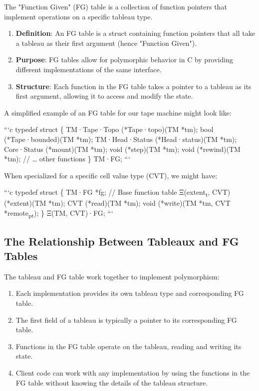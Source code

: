 \documentclass[11pt]{article}
\begin{document}
The "Function Given" (FG) table is a collection of function pointers that implement operations on a specific tableau type.

\begin{enumerate}
\item \textbf{\textbf{Definition}}: An FG table is a struct containing function pointers that all take a tableau as their first argument (hence "Function Given").

\item \textbf{\textbf{Purpose}}: FG tables allow for polymorphic behavior in C by providing different implementations of the same interface.

\item \textbf{\textbf{Structure}}: Each function in the FG table takes a pointer to a tableau as its first argument, allowing it to access and modify the state.
\end{enumerate}

A simplified example of an FG table for our tape machine might look like:

```c
typedef struct \{
  TM·Tape·Topo (*Tape·topo)(TM *tm);
  bool (*Tape·bounded)(TM *tm);
  TM·Head·Status (*Head·status)(TM *tm);
  Core·Status (*mount)(TM *tm);
  void (*step)(TM *tm);
  void (*rewind)(TM *tm);
  // \ldots{} other functions
\} TM·FG;
```

When specialized for a specific cell value type (CVT), we might have:

```c
typedef struct \{
  TM·FG *fg;  // Base function table
  Ξ(extent\textsubscript{t}, CVT) (*extent)(TM *tm);
  CVT (*read)(TM *tm);
  void (*write)(TM *tm, CVT *remote\textsubscript{pt});
\} Ξ(TM, CVT)·FG;
```

\subsection{The Relationship Between Tableaux and FG Tables}
\label{sec:org6e5cc1f}

The tableau and FG table work together to implement polymorphism:

\begin{enumerate}
\item Each implementation provides its own tableau type and corresponding FG table.
\item The first field of a tableau is typically a pointer to its corresponding FG table.
\item Functions in the FG table operate on the tableau, reading and writing its state.
\item Client code can work with any implementation by using the functions in the FG table without knowing the details of the tableau structure.
\end{enumerate}
\end{document}
